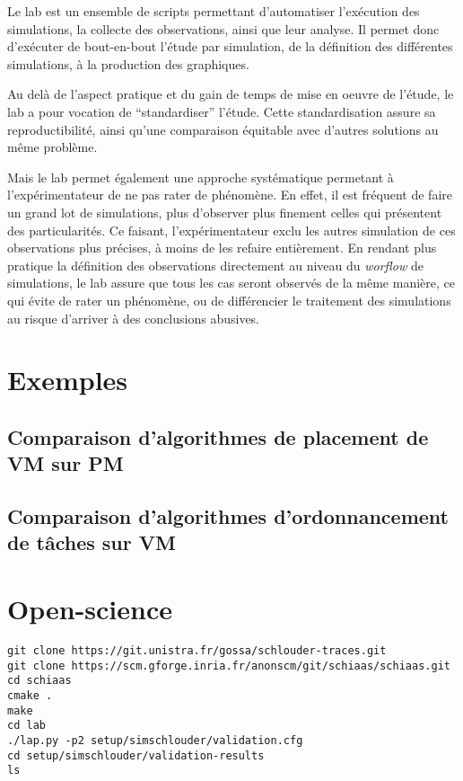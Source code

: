 \documentclass[parallelisme]{compas2017}
\begin{document}
Le lab est un ensemble de scripts permettant d'automatiser l'exécution des simulations, la collecte des
observations, ainsi que leur analyse. Il permet donc d'exécuter de bout-en-bout l'étude par simulation,
de la définition des différentes simulations, à la production des graphiques.

Au delà de l'aspect pratique et du gain de temps de mise en oeuvre de l'étude, le lab a pour vocation
de ``standardiser'' l'étude. Cette standardisation assure sa reproductibilité, ainsi qu'une comparaison
équitable avec d'autres solutions au même problème.

Mais le lab permet également une approche systématique permetant à l'expérimentateur de ne pas rater 
de phénomène. En effet, il est fréquent de faire un grand lot de simulations, plus d'observer plus
finement celles qui présentent des particularités. Ce faisant, l'expérimentateur exclu les autres 
simulation de ces observations plus précises, à moins de les refaire entièrement. En rendant plus 
pratique la définition des observations directement au niveau du \textit{worflow} de simulations, 
le lab assure que tous les cas seront observés de la même manière, ce qui évite de rater un phénomène,
ou de différencier le traitement des simulations au risque d'arriver à des conclusions abusives.


\section{Exemples}

\subsection{Comparaison d'algorithmes de placement de VM sur PM}

\subsection{Comparaison d'algorithmes d'ordonnancement de tâches sur VM}

\section{Open-science}

\begin{verbatim}
git clone https://git.unistra.fr/gossa/schlouder-traces.git
git clone https://scm.gforge.inria.fr/anonscm/git/schiaas/schiaas.git 
cd schiaas
cmake .
make
cd lab
./lap.py -p2 setup/simschlouder/validation.cfg
cd setup/simschlouder/validation-results
ls
\end{verbatim}



\end{document}
